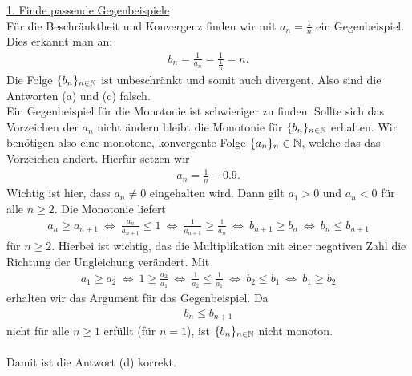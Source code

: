 \underline{1. Finde passende Gegenbeispiele}\\
Für die Beschränktheit und Konvergenz finden wir mit $ a_n = \frac{1}{n} $ ein  Gegenbeispiel. Dies erkannt man an:
\begin{align*}
	b_n = \frac{1}{a_n}
	=
	\frac{1}{\frac{1}{n}} = n.
\end{align*}
Die Folge $ \{ b_n\}_{n \in \mathbb{N} } $ ist unbeschränkt und somit auch divergent.
Also sind die Antworten (a) und (c) falsch.\\
Ein Gegenbeispiel für die Monotonie ist schwieriger zu finden.
Sollte sich das Vorzeichen der $ a_n $ nicht ändern bleibt die Monotonie für $ \{ b_n\}_{n \in \mathbb{N} } $ erhalten.
Wir benötigen also eine monotone, konvergente Folge $ \{a_n\}_n \in \mathbb{N} $, welche das das Vorzeichen ändert.
Hierfür setzen wir
\begin{align*}
	a_n = \frac{1}{n} - 0.9.
\end{align*} 
Wichtig ist hier, dass $ a_n \neq 0 $ eingehalten wird.
Dann gilt $ a_1 > 0 $ und $ a_n < 0 $ für alle $ n \geq 2 $.
Die Monotonie liefert
\begin{align*}
	a_n \geq a_{n+1}
	\ \Leftrightarrow \
	\frac{a_n}{a_{n+1}}  \leq 1
	\ \Leftrightarrow \ 
	\frac{1}{a_{n+1}} \geq  \frac{1}{a_n}
	\ \Leftrightarrow \ 
	b_{n+1} \geq  b_n
	\ \Leftrightarrow \ 
	b_{n} \leq  b_{n+1}
\end{align*} 
für $ n \geq 2 $. Hierbei ist wichtig, das die Multiplikation mit einer negativen Zahl die Richtung der Ungleichung verändert. Mit 
\begin{align*}
	a_1 \geq a_2
	\ \Leftrightarrow \
	1 \geq \frac{a_2}{a_1}
	\ \Leftrightarrow \
	\frac{1}{a_2} \leq \frac{1}{a_1}
	\ \Leftrightarrow \
	b_2 \leq b_1
	\ \Leftrightarrow \
	b_1 \geq b_2
\end{align*}
erhalten wir das Argument für das Gegenbeispiel. Da 
\begin{align*}
	b_n \leq b_{n+1}
\end{align*}
nicht für alle $ n \geq 1 $ erfüllt (für $ n = 1 $), ist $ \{b_n\}_{n \in \mathbb{N}} $ nicht monoton.\\
\\
Damit ist die Antwort (d) korrekt. 




\newpage

